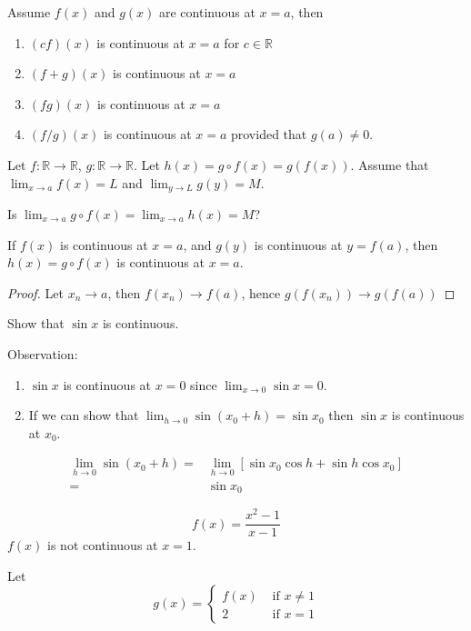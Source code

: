 \begin{thm}
Assume $f(x)$ and $g(x)$ are continuous at $x=a$, then \begin{enumerate}
    \item $(cf)(x)$ is continuous at $x=a$ for $c\in\mathbb{R}$
    \item $(f+g)(x)$ is continuous at $x=a$
    \item $(fg)(x)$ is continuous at $x=a$
    \item $(f/g)(x)$ is continuous at $x=a$ provided that $g(a) \neq 0$.
\end{enumerate}
\end{thm}


\begin{ques}
Let $f\colon \mathbb{R}\to\mathbb{R}$,  $g\colon \mathbb{R}\to\mathbb{R}$. Let $h(x) = g\circ f(x) = g(f(x))$. Assume that $\lim_{x\to a} f(x) = L$ and $\lim_{y\to L} g(y)=M$.

Is $\lim_{x\to a} g\circ f(x) = \lim_{x\to a} h(x) = M$?
\end{ques}

\begin{thm}
If $f(x)$ is continuous at $x=a$, and $g(y)$ is continuous at $y=f(a)$, then $h(x) = g\circ f(x)$ is continuous at $x=a$.
\end{thm}

\begin{proof}
Let $x_n\to a$, then $f(x_n)\to f(a)$, hence $g(f(x_n)) \to g(f(a))$
\end{proof}

\begin{exmp}
Show that $\sin x$ is continuous.

Observation:

\begin{enumerate}
\item $\sin x$ is continuous at $x=0$ since $\lim_{x\to 0} \sin x = 0$.
\item If we can show that $\lim_{h\to 0} \sin (x_0+h) = \sin x_0$ then $\sin x$ is continuous at $x_0$.
\end{enumerate}

\begin{align*}
    \lim_{h\to 0} \sin (x_0+h) = & \lim_{h\to 0} [\sin x_0 \cos h + \sin h \cos x_0]\\
    = & \sin x_0
\end{align*}
\end{exmp}


\begin{exmp}
\[f(x) = \frac{x^2-1}{x-1}\]
$f(x)$ is not continuous at $x=1$.

Let \[g(x) = \begin{cases} f(x) & \text{ if } x\neq 1 \\ 2 & \text{ if } x=1 \end{cases}\]
\end{exmp}

